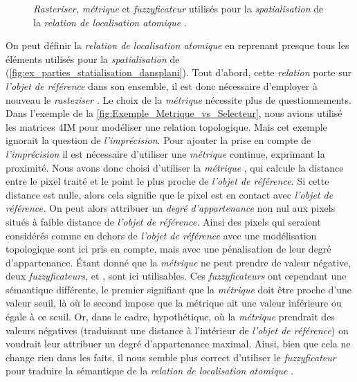\begin{figure}
  \centering
  
  \caption{\emph{Rasteriser,} \emph{métrique} et \emph{fuzzyficateur}
    utilisés pour la \emph{spatialisation} de la \emph{relation de
      localisation atomique}
    \protect{}.}
  \label{fig:ex_parties_statialisation_sousalt}
\end{figure}

On peut définir la \emph{relation de localisation atomique}
 en reprenant presque tous les
éléments utilisés pour la \emph{spatialisation} de
(\autoref{fig:ex_parties_statialisation_dansplani}). Tout d'abord,
cette \emph{relation} porte sur \emph{l'objet de référence} dans son
ensemble, il est donc nécessaire d'employer à nouveau le
\emph{rasteziser} . Le choix de la
\emph{métrique} nécessite plus de questionnements.
%
Dans l'exemple de la \autoref{fig:Exemple_Metrique_vs_Selecteur}, nous
avions utilisé les matrices 4IM pour modéliser une relation
topologique. Mais cet exemple ignorait la question de
\emph{l'imprécision}. Pour ajouter la prise en compte de
\emph{l'imprécision} il est nécessaire d'utiliser une \emph{métrique}
continue, exprimant la proximité. Nous avons donc choisi d'utiliser la
\emph{métrique} , qui calcule la distance entre
le pixel traité et le point le plus proche de \emph{l'objet de
  référence.} Si cette distance est nulle, alors cela signifie que le
pixel est en contact avec \emph{l'objet de référence.} On peut alors
attribuer un \emph{degré d'appartenance} non nul aux pixels situés à
faible distance de \emph{l'objet de référence.} Ainsi des pixels qui
seraient considérés comme en dehors de \emph{l'objet de référence}
avec une modélisation topologique sont ici pris en compte, mais avec
une pénalisation de leur degré d'appartenance. Étant donné que la
\emph{métrique}  ne peut prendre de valeur
négative, deux \emph{fuzzyficateurs,}  et
, sont ici utilisables. Ces
\emph{fuzzyficateurs} ont cependant une sémantique différente, le
premier signifiant que la \emph{métrique} doit être proche d'une
valeur seuil, là où le second impose que la métrique ait une valeur
inférieure ou égale à ce seuil. Or, dans le cadre, hypothétique, où la
\emph{métrique}  prendrait des valeurs négatives
(\ie traduisant une distance à l'intérieur de \emph{l'objet de
  référence}) on voudrait leur attribuer un degré d'appartenance
maximal. Ainsi, bien que cela ne change rien dans les faits, il nous
semble plus correct d'utiliser le \emph{fuzzyficateur}
 pour traduire la sémantique de la \emph{relation
  de localisation atomique} .

